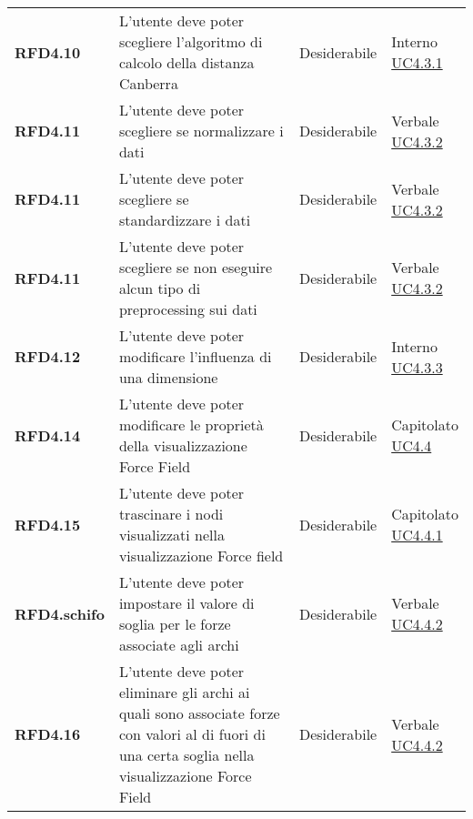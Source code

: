 \begin{longtable}[H]{>{\raggedright\bfseries}m{20mm} >{\raggedright}m{90mm} >{\raggedright}m{28mm} >{\raggedright\arraybackslash}m{30mm}}
    RFD4.10
    & L'utente deve poter scegliere l'algoritmo di calcolo della distanza Canberra
    & Desiderabile
    & \makecell{ Interno \\ \hyperref[par:uc4.3.1]{UC4.3.1} }\\

    RFD4.11
    & L'utente deve poter scegliere se normalizzare i dati
    & Desiderabile
    & \makecell{ Verbale \\ \hyperref[par:uc4.3.2]{UC4.3.2} }\\

    RFD4.11
    & L'utente deve poter scegliere se standardizzare i dati
    & Desiderabile
    & \makecell{ Verbale \\ \hyperref[par:uc4.3.2]{UC4.3.2} }\\

    RFD4.11
    & L'utente deve poter scegliere se non eseguire alcun tipo di preprocessing sui dati
    & Desiderabile
    & \makecell{ Verbale \\ \hyperref[par:uc4.3.2]{UC4.3.2} }\\


    RFD4.12
    & L'utente deve poter modificare l'influenza di una dimensione
    & Desiderabile
    & \makecell{ Interno \\ \hyperref[par:uc4.3.3]{UC4.3.3} }\\

    RFD4.14
    & L'utente deve poter modificare le proprietà della visualizzazione Force Field
    & Desiderabile
    & \makecell{ Capitolato \\ \hyperref[ssub:uc4.4]{UC4.4} }\\

    RFD4.15
    & L'utente deve poter trascinare i nodi visualizzati nella visualizzazione Force field
    & Desiderabile
    & \makecell{ Capitolato \\ \hyperref[par:uc4.4.1]{UC4.4.1} }\\

    RFD4.schifo
    & L'utente deve poter impostare il valore di soglia per le forze associate agli archi
    & Desiderabile
    & \makecell{ Verbale \\ \hyperref[par:uc4.4.2]{UC4.4.2} }\\

    RFD4.16
    & L'utente deve poter eliminare gli archi ai quali sono associate forze con valori al di fuori di una certa soglia
    nella visualizzazione Force Field
    & Desiderabile
    & \makecell{ Verbale \\ \hyperref[par:uc4.4.2]{UC4.4.2} }\\


\end{longtable}
